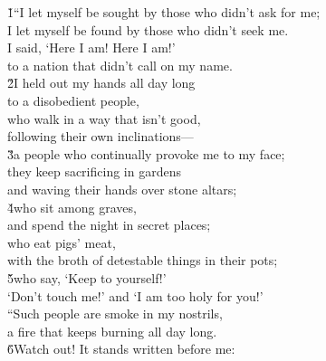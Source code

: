 \begin{poetry}
\poeml {}
\v{1}``I let myself be sought by those who didn't ask for me; \\
\poemll    I let myself be found by those who didn't seek me. \\
\poeml I said, `Here I am! Here I am!' \\
\poemll    to a nation that didn't call on my name. \\
\poeml \v{2}I held out my hands all day long \\
\poemll    to a disobedient people, \\
\poeml who walk in a way that isn't good, \\
\poemll    following their own inclinations--- \\
\poeml \v{3}a people who continually provoke me to my face; \\
\poemll    they keep sacrificing in gardens \\
\poemlll       and waving their hands over stone altars; \\
\poeml \v{4}who sit among graves, \\
\poemll    and spend the night in secret places; \\
\poeml who eat pigs' meat, \\
\poemll    with the broth of detestable things in their pots; \\
\poeml \v{5}who say, `Keep to yourself!' \\
\poemll    `Don't touch me!' and `I am too holy for you!' \\
\poeml ``Such people are smoke in my nostrils, \\
\poemll    a fire that keeps burning all day long. \\
\poeml \v{6}Watch out! It stands written before me: \\

\end{poetry}
